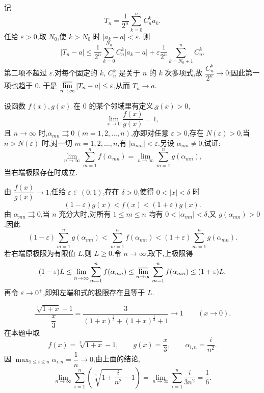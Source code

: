 \begin{solution}
  记
  \[
    T_n=\dfrac{1}{2^n}\sum\limits_{k=0}^n C_n^k a_k.
  \]
  任给 $\varepsilon>0$,取 $N_0$,使 $k>N_0$ 时 $|a_k-a|<\varepsilon$.
  则
  \[
    |T_n-a|
    \leq\dfrac{1}{2^n}\sum\limits_{k=0}^{N_0}C_n^k|a_k-a|
    +\varepsilon\dfrac{1}{2^n}\sum\limits_{k=N_0+1}^n C_n^k.
  \]
  第二项不超过 $\varepsilon$.对每个固定的 $k$,
  $C_n^k$ 是关于 $n$ 的 $k$ 次多项式,故 $\dfrac{C_n^k}{2^n}\to0$;因此第一项也趋于 $0$.
  于是 $\varlimsup\limits_{n\to\infty}|T_n-a|\leq\varepsilon$,从而 $T_n\to a$.
\end{solution}

\begin{example}
  设函数 $f(x),g(x)$ 在 $0$ 的某个邻域里有定义,$g(x)>0$,
  \[
    \displaystyle\lim\limits_{x\to0}\dfrac{f(x)}{g(x)}=1,
  \]
  且 $n\to\infty$ 时,$\alpha_{mn}\rightrightarrows0\,(m=1,2,\ldots,n)$,亦即对任意
  $\varepsilon>0$,存在 $N(\varepsilon)>0$,当 $n>N(\varepsilon)$ 时,对一切
  $m=1,2,\ldots,n$,有 $|\alpha_{mn}|<\varepsilon$.另设 $\alpha_{mn}\neq0$,试证:
  \[
    \displaystyle\lim\limits_{n\to\infty}\sum\limits_{m=1}^n f(\alpha_{mn})
    =
    \lim\limits_{n\to\infty}\sum\limits_{m=1}^n g(\alpha_{mn}),
  \]
  当右端极限存在时成立.
\end{example}
\exampleblank

\begin{solution}
  由 $\dfrac{f(x)}{g(x)}\to1$,任给 $\varepsilon\in(0,1)$,存在 $\delta>0$,使得
  $0<|x|<\delta$ 时
  \[
    (1-\varepsilon)g(x)<f(x)<(1+\varepsilon)g(x).
  \]
  由 $\alpha_{mn}\rightrightarrows0$,当 $n$ 充分大时,对所有
  $1\leq m\leq n$ 均有 $0<|\alpha_{mn}|<\delta$,又 $g(\alpha_{mn})>0$.因此
  \[
    (1-\varepsilon)\sum\limits_{m=1}^n g(\alpha_{mn})
    <\sum\limits_{m=1}^n f(\alpha_{mn})
    <(1+\varepsilon)\sum\limits_{m=1}^n g(\alpha_{mn}).
  \]
  若右端原极限为有限值 $L$,则 $L\geq0$.令 $n\to\infty$,取下,上极限得
  \[
    (1-\varepsilon)L
    \leq\varliminf\limits_{n\to\infty}\sum\limits_{m=1}^n f(\alpha_{mn})
    \leq\varlimsup\limits_{n\to\infty}\sum\limits_{m=1}^n f(\alpha_{mn})
    \leq(1+\varepsilon)L.
  \]
  再令 $\varepsilon\to0^+$,即知左端和式的极限存在且等于 $L$.
\end{solution}

\begin{remark}
\[
\dfrac{\sqrt[3]{1+x}-1}{\dfrac{x}{3}}         
=\dfrac{3}{(1+x)^{\frac{2}{3}}+(1+x)^{\frac{1}{3}}+1}
\longrightarrow 1 \qquad (x\to 0).
\]
  在本题中取
  \[
    f(x)=\sqrt[3]{1+x}-1,
    \qquad
    g(x)=\dfrac{x}{3},
    \qquad
    \alpha_{i,n}=\dfrac{i}{n^2}.
  \]
  因 $\displaystyle\max_{1\leq i\leq n}\alpha_{i,n}=\dfrac{1}{n}\to0$,由上面的结论,
  \[
    \displaystyle\lim\limits_{n\to\infty}\sum\limits_{i=1}^n
    \left(\sqrt[3]{1+\dfrac{i}{n^2}}-1\right)
    =
    \lim\limits_{n\to\infty}\sum\limits_{i=1}^n\dfrac{i}{3n^2}
    =\dfrac{1}{6}.
  \]
\end{remark}



